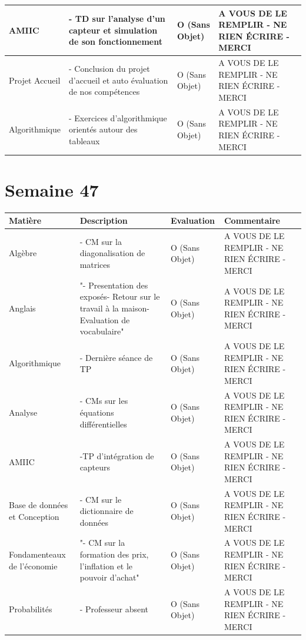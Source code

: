 \documentclass[12pt, openany]{report}
\begin{document}
\begin{tabular}{|l|l|l|l|}
\hline
AMIIC & - TD sur l'analyse d'un capteur et simulation de son fonctionnement & O (Sans Objet) & A VOUS DE LE REMPLIR - NE RIEN ÉCRIRE - MERCI \\ 
\hline
Projet Accueil & - Conclusion du projet d'accueil et auto évaluation de nos compétences & O (Sans Objet) & A VOUS DE LE REMPLIR - NE RIEN ÉCRIRE - MERCI \\ 
\hline
Algorithmique & - Exercices d'algorithmique orientés autour des tableaux & O (Sans Objet) & A VOUS DE LE REMPLIR - NE RIEN ÉCRIRE - MERCI \\ 
\hline
\end{tabular}

\section*{Semaine 47}
\begin{tabular}{|l|l|l|l|}
\hline
Matière & Description & Evaluation & Commentaire \\ 
\hline
Algèbre & - CM sur la diagonalisation de matrices & O (Sans Objet) & A VOUS DE LE REMPLIR - NE RIEN ÉCRIRE - MERCI \\ 
\hline
Anglais & "- Presentation des exposés- Retour sur le travail à la maison- Evaluation de vocabulaire" & O (Sans Objet) & A VOUS DE LE REMPLIR - NE RIEN ÉCRIRE - MERCI \\ 
\hline
Algorithmique & - Dernière séance de TP & O (Sans Objet) & A VOUS DE LE REMPLIR - NE RIEN ÉCRIRE - MERCI \\ 
\hline
Analyse & - CMs sur les équations différentielles & O (Sans Objet) & A VOUS DE LE REMPLIR - NE RIEN ÉCRIRE - MERCI \\ 
\hline
AMIIC & -TP d'intégration de capteurs & O (Sans Objet) & A VOUS DE LE REMPLIR - NE RIEN ÉCRIRE - MERCI \\ 
\hline
Base de données et Conception & - CM sur le dictionnaire de données & O (Sans Objet) & A VOUS DE LE REMPLIR - NE RIEN ÉCRIRE - MERCI \\ 
\hline
Fondamenteaux de l'économie & "- CM sur la formation des prix, l'inflation et le pouvoir d'achat" & O (Sans Objet) & A VOUS DE LE REMPLIR - NE RIEN ÉCRIRE - MERCI \\ 
\hline
Probabilités & - Professeur absent & O (Sans Objet) & A VOUS DE LE REMPLIR - NE RIEN ÉCRIRE - MERCI \\ 
\hline
\end{tabular}
\end{document}
